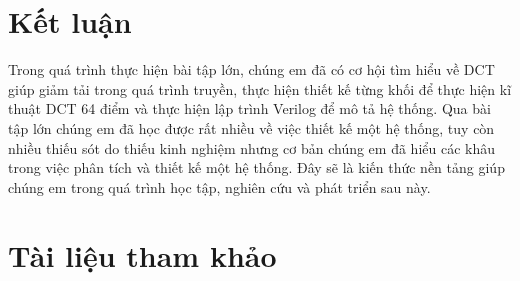 \documentclass[conference]{IEEEtran}
\begin{document}
	\section{Kết luận}
	Trong quá trình thực hiện bài tập lớn, chúng em đã có cơ hội tìm hiểu về DCT giúp giảm tải trong quá trình truyền, thực hiện thiết kế từng khối để thực hiện kĩ thuật DCT 64 điểm và thực hiện lập trình Verilog để mô tả hệ thống.
	Qua bài tập lớn chúng em đã học được rất nhiều về việc thiết kế một hệ thống, tuy còn nhiều thiếu sót do thiếu kinh nghiệm nhưng cơ bản chúng em đã hiểu các khâu trong việc phân tích và thiết kế một hệ thống. Đây sẽ là kiến thức nền tảng giúp chúng em trong quá trình học tập, nghiên cứu và phát triển sau này.
	\section{Tài liệu tham khảo}
	
	 
\end{document}
